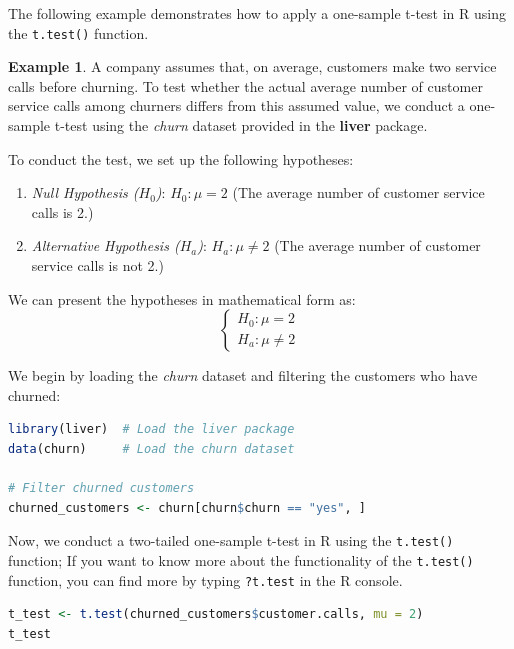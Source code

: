 \documentclass[
]{book}
\newcommand{\passthrough}[1]{#1}
\providecommand{\tightlist}{%
  \setlength{\itemsep}{0pt}\setlength{\parskip}{0pt}}
\theoremstyle{definition}
\theoremstyle{definition}
\newtheorem{example}{Example}[chapter]
\theoremstyle{definition}
\theoremstyle{definition}
\theoremstyle{remark}
\begin{document}
The following example demonstrates how to apply a one-sample t-test in R using the \passthrough{\lstinline!t.test()!} function.

\begin{example}
\protect\hypertarget{exm:ex-one-sample-test}{}\label{exm:ex-one-sample-test}A company assumes that, on average, customers make two service calls before churning. To test whether the actual average number of customer service calls among churners differs from this assumed value, we conduct a one-sample t-test using the \emph{churn} dataset provided in the \textbf{liver} package.

To conduct the test, we set up the following hypotheses:

\begin{enumerate}
\def\labelenumi{\arabic{enumi}.}
\tightlist
\item
  \emph{Null Hypothesis (\(H_0\))}: \(H_0: \mu = 2\) (The average number of customer service calls is 2.)\\
\item
  \emph{Alternative Hypothesis (\(H_a\))}: \(H_a: \mu \neq 2\) (The average number of customer service calls is not 2.)
\end{enumerate}

We can present the hypotheses in mathematical form as:
\[
\begin{cases}
    H_0: \mu = 2   \\
    H_a: \mu \neq 2  
\end{cases}
\]

We begin by loading the \emph{churn} dataset and filtering the customers who have churned:

\begin{lstlisting}[language=R]
library(liver)  # Load the liver package
data(churn)     # Load the churn dataset

# Filter churned customers
churned_customers <- churn[churn$churn == "yes", ]
\end{lstlisting}

Now, we conduct a two-tailed one-sample t-test in R using the \passthrough{\lstinline!t.test()!} function; If you want to know more about the functionality of the \passthrough{\lstinline!t.test()!} function, you can find more by typing \passthrough{\lstinline!?t.test!} in the R console.

\begin{lstlisting}[language=R]
t_test <- t.test(churned_customers$customer.calls, mu = 2)
t_test
   

\end{lstlisting}
\end{example}
\end{document}
